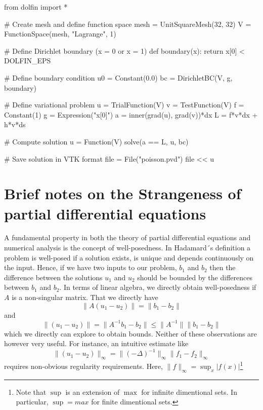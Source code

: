 \begin{python}
from dolfin import *

# Create mesh and define function space
mesh = UnitSquareMesh(32, 32)
V = FunctionSpace(mesh, "Lagrange", 1)

# Define Dirichlet boundary (x = 0 or x = 1)
def boundary(x): return x[0] < DOLFIN_EPS 

# Define boundary condition
u0 = Constant(0.0)
bc = DirichletBC(V, g, boundary)

# Define variational problem
u = TrialFunction(V)
v = TestFunction(V)
f = Constant(1)
g = Expression("x[0]")
a = inner(grad(u), grad(v))*dx
L = f*v*dx + h*v*ds

# Compute solution
u = Function(V)
solve(a == L, u, bc)

# Save solution in VTK format
file = File("poisson.pvd")
file << u
\end{python}

\section{Brief notes on the Strangeness of partial differential equations }

A fundamental property in both the theory of partial differential equations and numerical analysis is the
concept of well-posedness. In Hadamard´s definition a problem is well-posed if a solution exists, is unique
and depends continuously on the input. Hence, if we have two inputs to our problem, $b_1$ and $b_2$ 
then the difference between the solutions $u_1$ and $u_2$ should be bounded by the differences
between $b_1$ and $b_2$. In terms of linear algebra, we directly obtain well-posedness if
$A$ is a non-singular matrix. That we directly have 
\[
\|A(u_1 - u_2) \| = \|b_1 - b_2\|     
\]
and 
\[
\|(u_1 - u_2) \| = \|A^{-1}b_1 - b_2\| \le  \|A^{-1}\| \|b_1 - b_2\|     
\]
which we directly can explore to obtain bounds. Neither of these observations are however
very useful. 
For instance, an intuitive estimate like  
\[
\|(u_1 - u_2) \|_\infty = \|(-\Delta)^{-1} \|_\infty \|f_1 - f_2\|_\infty     
\]
requires non-obvious regularity requirements. Here, 
$\|f \|_\infty = \sup_x |f(x)|$\footnote{Note that $\sup$ is an 
extension of $\max$ for infinite dimentional sets. In particular, $\sup=max$ for finite dimentional sets.}  

